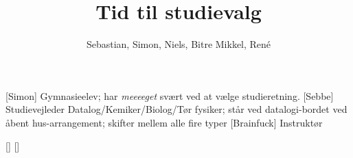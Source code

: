 \documentclass[a4paper,11pt]{article}
\title{Tid til studievalg}
\author{Sebastian, Simon, Niels, Bitre Mikkel, René}
\begin{document}
\maketitle

\begin{roles}
    [Simon] Gymnasieelev; har \emph{meeeeget} svært ved at vælge studieretning.
    [Sebbe] Studievejleder Datalog/Kemiker/Biolog/Tør fysiker; står ved datalogi-bordet ved åbent hus-arrangement; skifter mellem alle fire typer
    [Brainfuck] Instruktør
\end{roles}

\begin{props}
    []
    []
\end{props}
\end{document}
